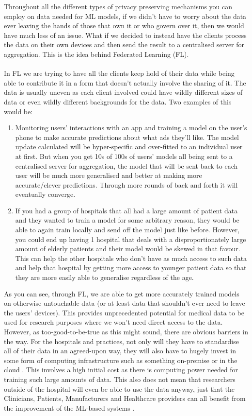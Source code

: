 Throughout all the different types of privacy preserving mechanisms you can employ on data needed for ML models, if we didn't have to worry about the data ever leaving the hands of those that own it or who govern over it, then we would have much less of an issue. What if we decided to instead have the clients process the data on their own devices and then send the result to a centralised server for aggregation. This is the idea behind Federated Learning (FL).
\\ \\
In FL we are trying to have all the clients keep hold of their data while being able to contribute it in a form that doesn't actually involve the sharing of it. The data is usually uneven as each client involved could have wildly different sizes of data or even wildly different backgrounds for the data. Two examples of this would be:
\begin{enumerate}
    \item Monitoring users' interactions with an app and training a model on the user's phone to make accurate predictions about what ads they'll like. The model update calculated will be hyper-specific and over-fitted to an individual user at first. But when you get 10s of 100s of users' models all being sent to a centralised server for aggregation, the model that will be sent back to each user will be much more generalised and better at making more accurate/clever predictions. Through more rounds of back and forth it will eventually converge.
    
    \item If you had a group of hospitals that all had a large amount of patient data and they wanted to train a model for some arbitrary reason, they would be able to again train locally and send off the model just like before. However, you could end up having 1 hospital that deals with a disproportionately large amount of elderly patients and their model would be skewed in that favour. This can help the other hospitals who don't have as much access to such data and help that hospital by getting more access to younger patient data so that they are more easily able to generalise regardless of the age.
\end{enumerate}
As you can see, through FL, we are able to get more accurately trained models on otherwise untouchable data (or at least data that shouldn't ever need to leave the users' devices). This provides unprecedented potential for medical data to be used for research purposes where we won't need direct access to the data. However, as too-good-to-be-true as this might sound, there are obvious barriers in the way. For the hospitals and practices, not only will they have to standardise all of their data in an agreed-upon way, they will also have to hugely invest in some form of computing infrastructure such as something on-premise or in the cloud \cite{future_health_fl}. This involves a high initial cost as there is computing power needed for training such large amounts of data. This also does not mean that researchers outside of the hospital will even be able to use the data anyway, just that the Clinicians, Patients, Manufacturers and Healthcare providers can all benefit from the improvement of the ML-based systems \cite{future_health_fl}.

